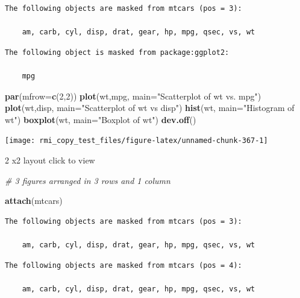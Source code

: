 \documentclass[]{book}
\newenvironment{Shaded}{\begin{snugshade}}{\end{snugshade}}
\newcommand{\KeywordTok}[1]{\textcolor[rgb]{0.13,0.29,0.53}{\textbf{#1}}}
\newcommand{\DataTypeTok}[1]{\textcolor[rgb]{0.13,0.29,0.53}{#1}}
\newcommand{\DecValTok}[1]{\textcolor[rgb]{0.00,0.00,0.81}{#1}}
\newcommand{\StringTok}[1]{\textcolor[rgb]{0.31,0.60,0.02}{#1}}
\newcommand{\CommentTok}[1]{\textcolor[rgb]{0.56,0.35,0.01}{\textit{#1}}}
\newcommand{\NormalTok}[1]{#1}
\theoremstyle{definition}
\theoremstyle{definition}
\theoremstyle{definition}
\theoremstyle{remark}
\begin{document}
\begin{verbatim}
The following objects are masked from mtcars (pos = 3):

    am, carb, cyl, disp, drat, gear, hp, mpg, qsec, vs, wt
\end{verbatim}

\begin{verbatim}
The following object is masked from package:ggplot2:

    mpg
\end{verbatim}

\begin{Shaded}
\begin{Highlighting}[]
\KeywordTok{par}\NormalTok{(}\DataTypeTok{mfrow=}\KeywordTok{c}\NormalTok{(}\DecValTok{2}\NormalTok{,}\DecValTok{2}\NormalTok{))}
\KeywordTok{plot}\NormalTok{(wt,mpg, }\DataTypeTok{main=}\StringTok{"Scatterplot of wt vs. mpg"}\NormalTok{)}
\KeywordTok{plot}\NormalTok{(wt,disp, }\DataTypeTok{main=}\StringTok{"Scatterplot of wt vs disp"}\NormalTok{)}
\KeywordTok{hist}\NormalTok{(wt, }\DataTypeTok{main=}\StringTok{"Histogram of wt"}\NormalTok{)}
\KeywordTok{boxplot}\NormalTok{(wt, }\DataTypeTok{main=}\StringTok{"Boxplot of wt"}\NormalTok{)}
\KeywordTok{dev.off}\NormalTok{()}
\end{Highlighting}
\end{Shaded}

\begin{center}\texttt{[image: rmi\_copy\_test\_files/figure-latex/unnamed-chunk-367-1]} \end{center}

2 x2 layout click to view

\begin{Shaded}
\begin{Highlighting}[]
\CommentTok{# 3 figures arranged in 3 rows and 1 column}

\KeywordTok{attach}\NormalTok{(mtcars)}
\end{Highlighting}
\end{Shaded}

\begin{verbatim}
The following objects are masked from mtcars (pos = 3):

    am, carb, cyl, disp, drat, gear, hp, mpg, qsec, vs, wt
\end{verbatim}

\begin{verbatim}
The following objects are masked from mtcars (pos = 4):

    am, carb, cyl, disp, drat, gear, hp, mpg, qsec, vs, wt
\end{verbatim}
\end{document}
